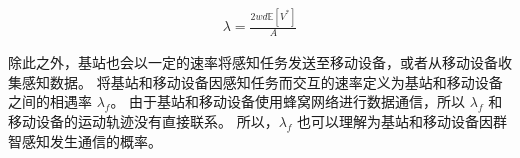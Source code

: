 \begin{equation}
  \label{Formula_EncounterRate}
  \begin{gathered}
  \lambda = \frac{2 w d \mathbb{E}[V^*]}{A}
  \end{gathered}
\end{equation}

除此之外，基站也会以一定的速率将感知任务发送至移动设备，或者从移动设备收集感知数据。
将基站和移动设备因感知任务而交互的速率定义为基站和移动设备之间的相遇率 $\lambda_f$。
由于基站和移动设备使用蜂窝网络进行数据通信，所以 $\lambda_f$ 和移动设备的运动轨迹没有直接联系。
所以，$\lambda_f$ 也可以理解为基站和移动设备因群智感知发生通信的概率。








